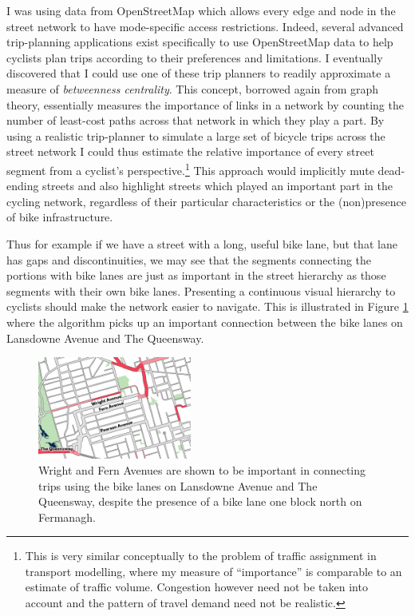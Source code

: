 \documentclass{article}
\begin{document}
		I was using data from OpenStreetMap which allows every edge and node in the street network to have mode-specific access restrictions. Indeed, several advanced trip-planning applications exist specifically to use OpenStreetMap data to help cyclists plan trips according to their preferences and limitations. I eventually discovered that I could use one of these trip planners to readily approximate a measure of \textit{betweenness centrality}. This concept, borrowed again from graph theory, essentially measures the importance of links in a network by counting the number of least-cost paths across that network in which they play a part. 
		By using a realistic trip-planner to simulate a large set of bicycle trips across the street network I could thus estimate the relative importance of every street segment from a cyclist's perspective.\footnote{
			This is very similar conceptually to the problem of traffic assignment in transport modelling, where my measure of ``importance'' is comparable to an estimate of traffic volume. Congestion however need not be taken into account and the pattern of travel demand need not be realistic. 
		}
		This approach would implicitly mute dead-ending streets and also highlight streets which played an important part in the cycling network, regardless of their particular characteristics or the (non)presence of bike infrastructure. 
		
		Thus for example if we have a street with a long, useful bike lane, but that lane has gaps and discontinuities, we may see that the segments connecting the portions with bike lanes are just as important in the street hierarchy as those segments with their own bike lanes. Presenting a continuous visual hierarchy to cyclists should make the network easier to navigate. This is illustrated in Figure \ref{fig:spanned-gap} where the algorithm picks up an important connection between the bike lanes on Lansdowne Avenue and The Queensway. 
		\begin{figure}[h!]
			\centering
			\includegraphics[width=0.45\textwidth]{spanned-gap}
			\caption{Wright and Fern Avenues are shown to be important in connecting trips using the bike lanes on Lansdowne Avenue and The Queensway, despite the presence of a bike lane one block north on Fermanagh.}
			\label{fig:spanned-gap}
		\end{figure}
	
\end{document}
